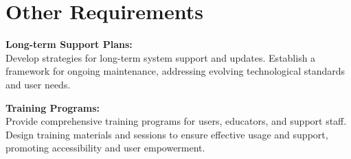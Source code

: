 \documentclass[12pt,a4paper]{report}
\begin{document}
\section{Other Requirements}
\textbf{Long-term Support Plans:}\\
Develop strategies for long-term system support and updates. Establish a framework for ongoing maintenance, addressing evolving technological standards and user needs.

\noindent\textbf{Training Programs:}\\
Provide comprehensive training programs for users, educators, and support staff. Design training materials and sessions to ensure effective usage and support, promoting accessibility and user empowerment.






\end{document}
